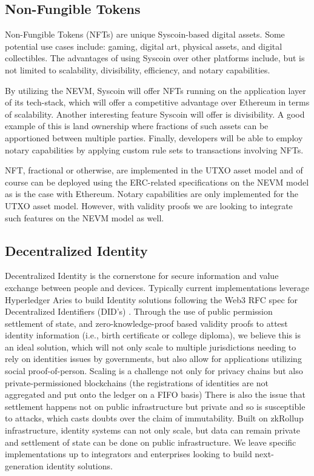 \documentclass[peerreview]{ieeesyscoin}
\begin{document}
\subsection{Non-Fungible Tokens}

Non-Fungible Tokens (NFTs) are unique Syscoin-based digital assets.  Some potential use cases include: gaming, digital art, physical assets, and digital collectibles. The advantages of using Syscoin over other platforms include, but is not limited to scalability, divisibility, efficiency, and notary capabilities. 

By utilizing the NEVM, Syscoin will offer NFTs running on the application layer of its tech-stack, which will offer a competitive advantage over Ethereum in terms of scalability. Another interesting feature Syscoin will offer is divisibility. A good example of this is land ownership where fractions of such assets can be apportioned between multiple parties. Finally, developers will be able to employ notary capabilities by applying custom rule sets to transactions involving NFTs.

NFT, fractional or otherwise, are implemented in the UTXO asset model and of course can be deployed using the ERC-related specifications on the NEVM model as is the case with Ethereum. Notary capabilities are only implemented for the UTXO asset model. However, with validity proofs we are looking to integrate such features on the NEVM model as well.

\subsection{Decentralized Identity}
Decentralized Identity is the cornerstone for secure information and value exchange between people and devices. Typically current implementations leverage Hyperledger Aries to build Identity solutions following the Web3 RFC spec for Decentralized Identifiers (DID's) \cite{DID}. Through the use of public permission settlement of state, and zero-knowledge-proof based validity proofs to attest identity information (i.e., birth certificate or college diploma), we believe this is an ideal solution, which will not only scale to multiple jurisdictions needing to rely on identities issues by governments, but also allow for applications utilizing  social proof-of-person. Scaling is a challenge not only for privacy chains but also private-permissioned blockchains (the registrations of identities are not aggregated and put onto the ledger on a FIFO basis) There is also the issue that settlement happens not on public infrastructure but private and so is susceptible to attacks, which casts doubts over the claim of immutability. Built on zkRollup infrastructure, identity systems can not only scale, but data can remain private and settlement of state can be done on public infrastructure. We leave specific implementations up to integrators and enterprises looking to build next-generation identity solutions.
\end{document}
